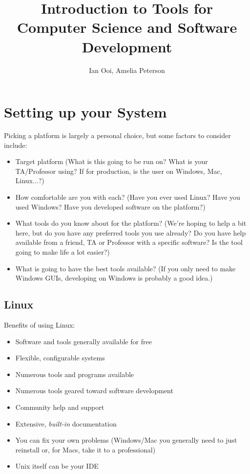 \documentclass[12pt]{book}
\title{Introduction to Tools for Computer Science and Software Development}
\author{Ian Ooi, Amelia Peterson}
\begin{document}
	\begin{titlepage}
		\maketitle
	\end{titlepage}
	\tableofcontents
	
	\chapter{Setting up your System}
		Picking a platform is largely a personal choice, but some factors to consider include:
		\begin{itemize}
			\item Target platform (What is this going to be run on?  What is your TA/Professor using?  If for production, is the user on Windows, Mac, Linux...?)
			\item How comfortable are you with each?  (Have you ever used Linux?  Have you used Windows?  Have you developed software on the platform?)
			\item What tools do you know about for the platform? (We're hoping to help a bit here, but do you have any preferred tools you use already?  Do you have help available from a friend, TA or Professor with a specific software?  Is the tool going to make life a lot easier?)
			\item What is going to have the best tools available? (If you only need to make Windows GUIs, developing on Windows is probably a good idea.)
		\end{itemize}
		\section{Linux}
			Benefits of using Linux:
			\begin{itemize}
				\item Software and tools generally available for free
				\item Flexible, configurable systems
				\item Numerous tools and programs available
				\item Numerous tools geared toward software development
				\item Community help and support
				\item Extensive, \emph{built-in} documentation
				\item You can fix your own problems (Windows/Mac you generally need to just reinstall or, for Macs, take it to a professional)
				\item Unix itself can be your IDE
			\end{itemize}
\end{document}
